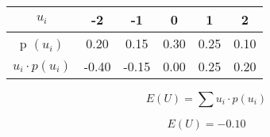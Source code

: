 \documentclass[a4paper,12pt]{article}
\begin{document}






\begin{center}
\begin{tabular}{|c|c|c|c|c|c|}
\hline $u_i$ & -2 & -1  & 0 & 1 & 2 \\ 
\hline p $(u_i)$ & \phantom{s}0.20\phantom{s} & \phantom{s}0.15\phantom{s}  & \phantom{s}0.30\phantom{s}  & \phantom{s}0.25\phantom{s} & \phantom{s}0.10\phantom{s} \\ 
\hline 
$u_i \cdot p (u_i)$ & -0.40 & -0.15 & 0.00 & 0.25 & 0.20 \\\hline
\end{tabular} 


\end{center}



\[ E(U) =  \sum  u_i \cdot p(u_i)   \]


\[E(U) = -0.10\]
\end{document}
